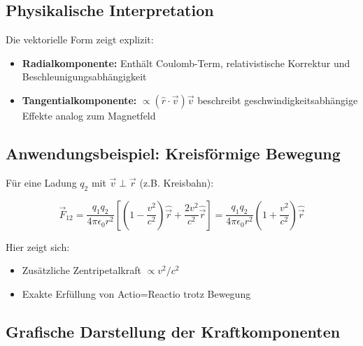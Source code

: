 \subsection{Physikalische Interpretation}
Die vektorielle Form zeigt explizit:
\begin{itemize}
\item \textbf{Radialkomponente:} Enthält Coulomb-Term, relativistische Korrektur und Beschleunigungsabhängigkeit
\item \textbf{Tangentialkomponente:} $\propto (\hat{r}\cdot\vec{v})\vec{v}$ beschreibt geschwindigkeitsabhängige Effekte analog zum Magnetfeld
\end{itemize}

\subsection{Anwendungsbeispiel: Kreisförmige Bewegung}
Für eine Ladung $q_2$ mit $\vec{v} \perp \vec{r}$ (z.B. Kreisbahn):

\begin{equation}
\vec{F}_{12} = \frac{q_1 q_2}{4\pi\epsilon_0 r^2} \left[
\left(1 - \frac{v^2}{c^2}\right)\hat{\vec{r}} + \frac{2v^2}{c^2}\hat{\vec{r}}
\right] = \frac{q_1 q_2}{4\pi\epsilon_0 r^2} \left(1 + \frac{v^2}{c^2}\right)\hat{\vec{r}}
\end{equation}

Hier zeigt sich:
\begin{itemize}
\item Zusätzliche Zentripetalkraft $\propto v^2/c^2$
\item Exakte Erfüllung von Actio=Reactio trotz Bewegung
\end{itemize}

\subsection{Grafische Darstellung der Kraftkomponenten}

